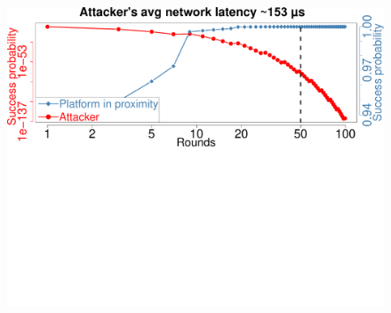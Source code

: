 \begin{figure}[t]
  \centering
    \includegraphics[trim={0 14.5cm 0 0}, clip, width=0.9\linewidth]{data/graph/AttackerSuccess_combined_new.pdf}
    \caption{\mainResultCaption}
   \vspace{-10px}
    \label{graph:attackerSuccess}
\end{figure}

\else

